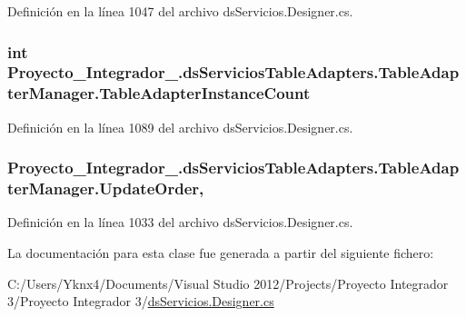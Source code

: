 Definición en la línea 1047 del archivo ds\-Servicios.\-Designer.\-cs.

\hypertarget{class_proyecto___integrador__3_1_1ds_servicios_table_adapters_1_1_table_adapter_manager_a247618c47c8308235c39b5cc88165cac}{
\subsubsection[{Table\-Adapter\-Instance\-Count}]{\setlength{\rightskip}{0pt plus 5cm}int Proyecto\-\_\-\-Integrador\-\_.\-ds\-Servicios\-Table\-Adapters.\-Table\-Adapter\-Manager.\-Table\-Adapter\-Instance\-Count\hspace{0.3cm}{\ttfamily [get]}}}\label{class_proyecto___integrador__3_1_1ds_servicios_table_adapters_1_1_table_adapter_manager_a247618c47c8308235c39b5cc88165cac}


Definición en la línea 1089 del archivo ds\-Servicios.\-Designer.\-cs.

\hypertarget{class_proyecto___integrador__3_1_1ds_servicios_table_adapters_1_1_table_adapter_manager_a091630e6863de7670f950252387391a2}{
\subsubsection[{Update\-Order}]{ Proyecto\-\_\-\-Integrador\-\_.\-ds\-Servicios\-Table\-Adapters.\-Table\-Adapter\-Manager.\-Update\-Order\hspace{0.3cm}{\ttfamily [get]}, {\ttfamily [set]}}}\label{class_proyecto___integrador__3_1_1ds_servicios_table_adapters_1_1_table_adapter_manager_a091630e6863de7670f950252387391a2}


Definición en la línea 1033 del archivo ds\-Servicios.\-Designer.\-cs.



La documentación para esta clase fue generada a partir del siguiente fichero\-:\begin{DoxyCompactItemize}
\item 
C\-:/\-Users/\-Yknx4/\-Documents/\-Visual Studio 2012/\-Projects/\-Proyecto Integrador 3/\-Proyecto Integrador 3/\hyperlink{ds_servicios_8_designer_8cs}{ds\-Servicios.\-Designer.\-cs}\end{DoxyCompactItemize}
